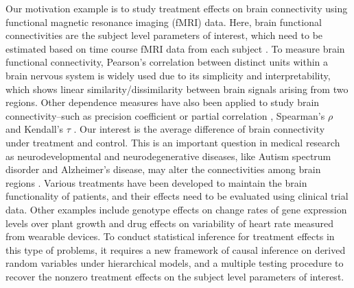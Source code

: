 \documentclass[12pt]{article}
\theoremstyle{definition}
\begin{document}
Our motivation example is to study treatment effects on brain connectivity using functional magnetic resonance imaging (fMRI) data.
Here, brain functional connectivities are the subject level parameters of interest, which need to be estimated based on time course fMRI data from each subject \citep{QZ2021}. 
To measure brain functional connectivity, Pearson’s correlation between distinct units within a brain nervous system \citep{andrews2007disruption, palaniyappan2013neural} is widely used due to its simplicity and interpretability, which shows linear similarity/dissimilarity between brain signals arising from two regions. 
Other dependence measures have also been applied to study brain connectivity--such as precision coefficient or partial correlation \citep{marrelec2006partial}, Spearman’s $\rho$ and Kendall’s $\tau$ \citep{berto2022association}.
Our interest is the average difference of brain connectivity under treatment and control.
This is an important question in medical research
as neurodevelopmental and neurodegenerative diseases, like Autism spectrum disorder and Alzheimer's disease, may alter the connectivities among brain regions \citep{andrews2007disruption, kana2014brain, berto2022association}. Various treatments have been developed to maintain the brain functionality of patients, and their effects need to be evaluated using clinical trial data.
Other examples include genotype effects on change rates of gene expression levels over plant growth and drug effects on variability of heart rate measured from wearable devices.
To conduct statistical inference for treatment effects in this type of problems, 
it requires a new framework of causal inference on derived random variables under hierarchical models,
and a multiple testing procedure to recover the nonzero treatment effects on the 
subject level parameters of interest. 
\end{document}
